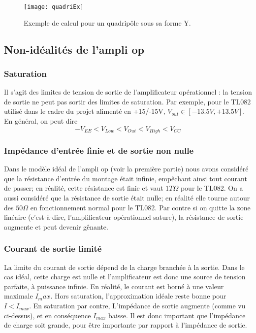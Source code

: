 \begin{figure}[h]
	\centering
    \texttt{[image: quadriEx]}
    \caption{Exemple de calcul pour un quadripôle sous sa forme Y.}
    \label{quadriEx}
\end{figure}

\subsection{Non-idéalités de l'ampli op}
\subsubsection*{Saturation}
Il s'agit des limites de tension de sortie de l'amplificateur opérationnel : la tension de sortie ne peut pas sortir des limites de saturation. Par exemple, pour le TL082 utilisé dans le cadre du projet alimenté en +15/-15V, $ V_{out} \in [ -13.5V,+13.5V ] $. En général, on peut dire $$-V_{EE}<V_{Low}<V_{Out}<V_{High}<V_{CC}$$

\subsubsection*{Impédance d'entrée finie et de sortie non nulle}
Dans le modèle idéal de l'ampli op (voir la première partie) nous avons considéré que la résistance d'entrée du montage était infinie, empêchant ainsi tout courant de passer; en réalité, cette résistance est finie et vaut $1T\Omega$ pour le TL082. On a aussi considéré que la résistance de sortie était nulle; en réalité elle tourne autour des $50\Omega$ en fonctionnement normal pour le TL082. Par contre si on quitte la zone linéaire (c'est-à-dire, l'amplificateur opérationnel sature), la résistance de sortie augmente et peut devenir gênante.

\subsubsection*{Courant de sortie limité}
La limite du courant de sortie dépend de la charge branchée à la sortie. Dans le cas idéal, cette charge est nulle et l'amplificateur est donc une source de tension parfaite, à puissance infinie. En réalité, le courant est borné à une valeur maximale $I_max$. Hors saturation, l'approximation idéale reste bonne pour $I < I_{max}$. En saturation par contre, L'impédance de sortie augmente (comme vu ci-dessus), et en conséquence $I_{max}$ baisse. Il est donc important que l'impédance de charge soit grande, pour être importante par rapport à l'impédance de sortie.

